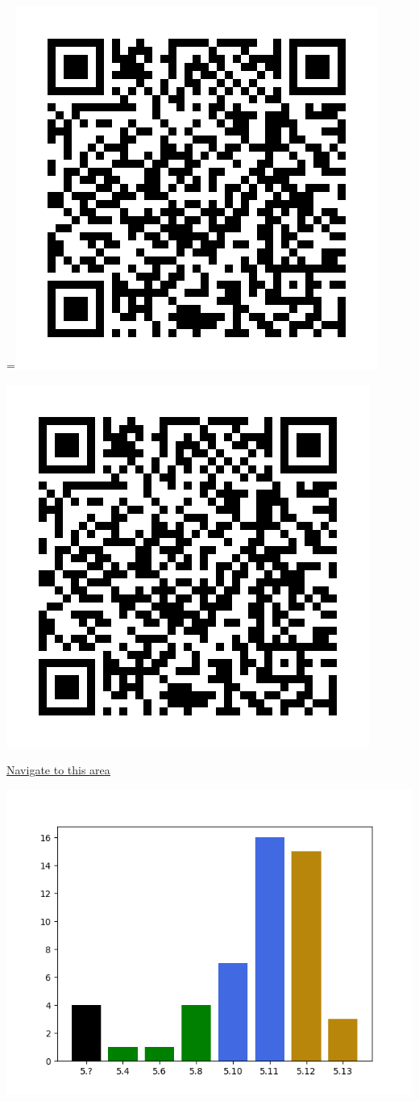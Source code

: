 \raggedcolumns
\begin{multicols}{2}
=\hbox{\includegraphics[width=0.45\linewidth]{./maps/qr//Garden Cliffs_qr.png}}%
\begin{center}
\includegraphics[width=0.45\linewidth]{./maps/qr//Garden Cliffs_qr.png}
\end{center}
\begin{center}
\underline{\textcolor{blue}{\href{http://maps.google.com/maps?q=44.43998124232581,-122.57539325959186}{Navigate to this area}}}
\end{center}


\includegraphics[width=\linewidth]{./maps/plots//Garden Cliffs.png}
\end{multicols}
